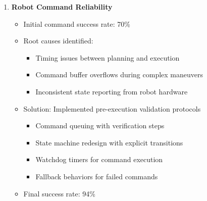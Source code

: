 \documentclass[12pt]{article}
\begin{document}
\begin{enumerate}
    \item \textbf{Robot Command Reliability}
    \begin{itemize}
        \item Initial command success rate: 70\%
        \item Root causes identified:
        \begin{itemize}
            \item Timing issues between planning and execution
            \item Command buffer overflows during complex maneuvers
            \item Inconsistent state reporting from robot hardware
        \end{itemize}
        \item Solution: Implemented pre-execution validation protocols
        \begin{itemize}
            \item Command queuing with verification steps
            \item State machine redesign with explicit transitions
            \item Watchdog timers for command execution
            \item Fallback behaviors for failed commands
        \end{itemize}
        \item Final success rate: 94\%
    \end{itemize}
    

\end{enumerate}
\end{document}

